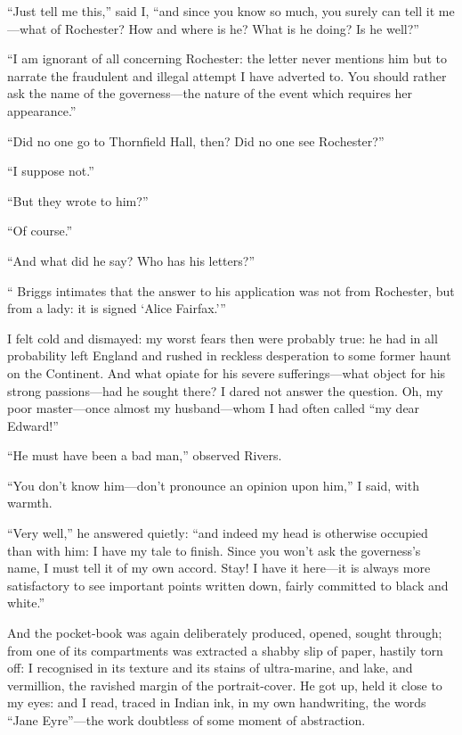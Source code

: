\enquote{Just tell me this,} said I, \enquote{and since you know so
much, you surely can tell it me---what of \Mr{} Rochester? How and where
is he? What is he doing? Is he well?}

\enquote{I am ignorant of all concerning \Mr{} Rochester: the letter never
mentions him but to narrate the fraudulent and illegal attempt I have
adverted to. You should rather ask the name of the governess---the
nature of the event which requires her appearance.}

\enquote{Did no one go to Thornfield Hall, then? Did no one see \Mr{}
 Rochester?}

\enquote{I suppose not.}

\enquote{But they wrote to him?}

\enquote{Of course.}

\enquote{And what did he say? Who has his letters?}

\enquote{\Mr{} Briggs intimates that the answer to his application was not
from \Mr{} Rochester, but from a lady: it is signed \enquote{Alice
Fairfax.}}

I felt cold and dismayed: my worst fears then were probably true: he had
in all probability left England and rushed in reckless desperation to
some former haunt on the Continent. And what opiate for his severe
sufferings---what object for his strong passions---had he sought there? 
I dared not answer the question. Oh, my poor master---once almost my
husband---whom I had often called \enquote{my dear Edward!}

\enquote{He must have been a bad man,} observed \Mr{} Rivers.

\enquote{You don't know him---don't pronounce an opinion upon him,} I
said, with warmth.

\enquote{Very well,} he answered quietly: \enquote{and indeed my head is
otherwise occupied than with him: I have my tale to finish. Since you
won't ask the governess's name, I must tell it of my own accord. Stay! 
I have it here---it is always more satisfactory to see important points
written down, fairly committed to black and white.}

And the pocket-book was again deliberately produced, opened, sought
through; from one of its compartments was extracted a shabby slip of
paper, hastily torn off: I recognised in its texture and its stains of
ultra-marine, and lake, and vermillion, the ravished margin of the
portrait-cover. He got up, held it close to my eyes: and I read, traced
in Indian ink, in my own handwriting, the words \enquote{{Jane Eyre}}---the
work doubtless of some moment of abstraction.

